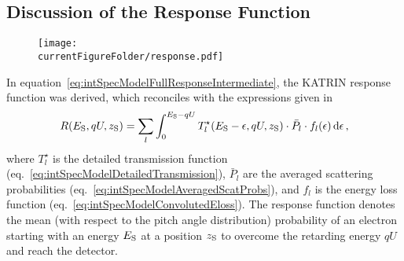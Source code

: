 \subsection{Discussion of the Response Function}
\label{sec:intSpecModelResponseSummary}
\begin{figure}
	\centering
	\texttt{[image: \\currentFigureFolder/response.pdf]}
	\label{fig:intSpecModelResponse}
\end{figure}
In equation~\eqref{eq:intSpecModelFullResponseIntermediate}, the KATRIN response function was derived, which reconciles with the expressions given in~\cite{Groh2015,Kleesiek2019}
\begin{equation}
\label{eq:intSpecModelResponse}
R(E_\mathrm{S}, qU, z_\mathrm{S}) =
\sum_{l}
	\int_{0}^{E_\mathrm{S}-qU}
		T_l^{\star}(E_\mathrm{S}-\epsilon,qU,z_\mathrm{S})
		\cdot \bar{P}_l \cdot f_l(\epsilon)
	\mathop{}\!\mathrm{d} \epsilon
\text{\,,}
\end{equation}
where $T_l^{\star}$ is the detailed transmission function (eq.~\ref{eq:intSpecModelDetailedTransmission}), $\bar{P}_l$ are the averaged scattering probabilities (eq.~\ref{eq:intSpecModelAveragedScatProbs}), and $f_l$ is the energy loss function (eq.~\ref{eq:intSpecModelConvolutedEloss}). The response function denotes the mean (with respect to the pitch angle distribution) probability of an electron starting with an energy $E_\mathrm{S}$ at a position $z_\mathrm{S}$ to overcome the retarding energy $qU$ and reach the detector. 

